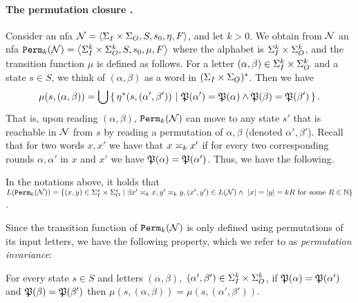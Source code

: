 \paragraph{The permutation closure .}
Consider an \gls{nfa} $\cN=\tup{\sI\times\sO,S,s_0,\eta,F}$, and let $k>0$. 
We obtain from $\cN$ an \gls{nfa} $\perm_k(\cN)=\tup{\sI^k \times \sO^k,S, s_0, \mu, F}$
where the alphabet is $\sI^k\times \sO^k$, and the transition function $\mu$ is defined as follows. For a letter $(\alpha,\beta)\in \sI^k \times \sO^k$ and a state $s\in S$, we think of $(\alpha,\beta)$ as a word in $(\sI\times \sO)^*$. Then we have
\begin{equation}
\label{test}
    \mu(s,(\alpha,\beta))=\bigcup\condset{\eta^*(s,(\alpha',\beta'))}{\fP(\alpha')=\fP(\alpha) \wedge \fP(\beta)=\fP(\beta')}.
\end{equation}
That is, upon reading $(\alpha,\beta)$, $\perm_k(\cN)$ can move to any state $s'$ that is reachable in $\cN$ from $s$
by reading a permutation of $\alpha,\beta$ (denoted $\alpha',\beta'$).
Recall that for two words $x,x'$ we have that $x\req[k]x'$ if for every two corresponding rounds $\alpha,\alpha'$ in $x$ and $x'$ we have $\fP(\alpha)=\fP(\alpha')$. 
Thus, we have the following.
\begin{observation}
	\label{obs:perm_closure_language}
	In the notations above, it holds that $L(\perm_k(\cN))=\{(x,y)\in \sI^*\times \sO^* \mid \exists x'\req[k] x, y'\req[k] y, (x',y')\in L(\cN) \wedge\ |x|=|y|=kR \text{ for some }R\in \bbN\}$.
	\end{observation}
Since the transition function of $\perm_k(\cN)$ is only defined using permutations of its input letters, we have the following property, which we refer to as \emph{permutation invariance}:
\begin{observation}
	\label{obs:perm_invariance}
	For every state $s\in S$ and letters $(\alpha,\beta),$ $(\alpha',\beta')\in \sI^k \times \sO^k$, if $\fP(\alpha)=\fP(\alpha')$ and $\fP(\beta)=\fP(\beta')$ then $\mu(s,(\alpha,\beta))=\mu(s,(\alpha',\beta'))$.
\end{observation}

